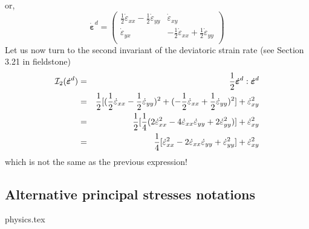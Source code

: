 or,
\[
\dot{\bm \varepsilon}^d = 
\left(
\begin{array}{cc}
\frac{1}{2}\dot{\varepsilon}_{xx} -\frac{1}{2}\dot{\varepsilon}_{yy} & \dot{\varepsilon}_{xy}  \\
\dot{\varepsilon}_{yx} & -\frac{1}{2}\dot{\varepsilon}_{xx} +\frac{1}{2} \dot{\varepsilon}_{yy}  \\
\end{array}
\right)
\]
Let us now turn to the second invariant of the deviatoric strain rate 
(see Section 3.21 in fieldstone)
\begin{eqnarray}
{\cal I}_2(\dot{\bm{\varepsilon}}^d)
&=& \frac{1}{2} \dot{\bm{\varepsilon}}^d:\dot{\bm{\varepsilon}}^d \\
&=& \frac{1}{2}[ (\frac{1}{2}\dot{\varepsilon}_{xx} -\frac{1}{2}\dot{\varepsilon}_{yy})^2 + (-\frac{1}{2}\dot{\varepsilon}_{xx} +\frac{1}{2} \dot{\varepsilon}_{yy})^2  ] + \dot{\varepsilon}_{xy}^2 \\
&=& \frac12 [ \frac14 (2\dot{\varepsilon}_{xx}^2  -4 \dot{\varepsilon}_{xx}\dot{\varepsilon}_{yy} +2\dot{\varepsilon}_{yy}^2 )  ] + \dot{\varepsilon}_{xy}^2 \\
&=& \frac14 [ \dot{\varepsilon}_{xx}^2  -2 \dot{\varepsilon}_{xx}\dot{\varepsilon}_{yy} +\dot{\varepsilon}_{yy}^2   ] + \dot{\varepsilon}_{xy}^2 
\end{eqnarray}
which is not the same as the previous expression! 








\subsection{Alternative principal stresses notations}\label{sec:altinv}
\begin{flushright} {\tiny {\color{gray} physics.tex}} \end{flushright}

